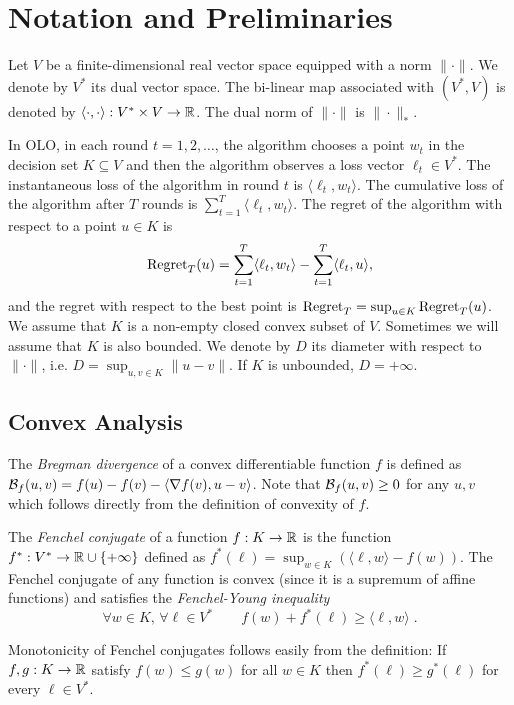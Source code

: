 \section{Notation and Preliminaries}
\label{section:preliminaries}

Let $V$ be a finite-dimensional real vector space equipped with a norm
$\|\cdot\|$. We denote by $V^*$ its dual vector space.  The bi-linear map
associated with $(V^*, V)$ is denoted by $\langle \cdot, \cdot \rangle:V^*
\times V \to \mathbb{R}$.  The dual norm of $\|\cdot\|$ is $\|\cdot\|_*$.

In OLO, in each round $t=1,2,\dots$, the algorithm chooses a point $w_t$ in the
decision set $K \subseteq V$ and then the algorithm observes a loss vector
$\ell_t \in V^*$. The instantaneous loss of the algorithm in round $t$ is
$\langle \ell_t, w_t \rangle$. The cumulative loss of the algorithm after $T$
rounds is $\sum_{t=1}^T \langle \ell_t, w_t \rangle$.  The regret of the
algorithm with respect to a point $u \in K$ is
$$
\operatorname{Regret}_T(u) = \sum_{t=1}^T \langle \ell_t, w_t \rangle - \sum_{t=1}^T \langle \ell_t, u \rangle,
$$
and the regret with respect to the best point is $\operatorname{Regret}_T= \sup_{u \in K}
\operatorname{Regret}_T(u)$.  We assume that $K$ is a non-empty closed convex subset of $V$.
Sometimes we will assume that $K$ is also bounded. We denote by $D$ its
diameter with respect to $\|\cdot\|$, i.e. $D = \sup_{u,v \in K} \|u - v\|$. If
$K$ is unbounded, $D = +\infty$.

\subsection{Convex Analysis}

The \emph{Bregman divergence} of a convex differentiable function $f$ is
defined as $\mathcal{B}_f(u,v) = f(u) - f(v) - \langle \nabla f(v), u - v \rangle$.
Note that $\mathcal{B}_f(u,v) \ge 0$ for any $u,v$ which follows directly from the
definition of convexity of $f$.

The \emph{Fenchel conjugate} of a function $f:K \to \mathbb{R}$ is the function
$f^*:V^* \to \mathbb{R} \cup \{+\infty\}$ defined as $f^*(\ell) = \sup_{w \in K} \left(
\langle \ell, w \rangle - f(w) \right)$.  The Fenchel conjugate of any function
is convex (since it is a supremum of affine functions) and satisfies
 the \emph{Fenchel-Young inequality}
$$
\text{$\forall w \in K$, $\forall \ell \in V^*$} \qquad
f(w) + f^*(\ell) \ge \langle \ell, w \rangle \; .
$$

Monotonicity of Fenchel conjugates follows easily from the definition: If
$f,g:K \to \mathbb{R}$ satisfy $f(w) \le g(w)$ for all $w \in K$ then $f^*(\ell) \ge
g^*(\ell)$ for every $\ell \in V^*$.

